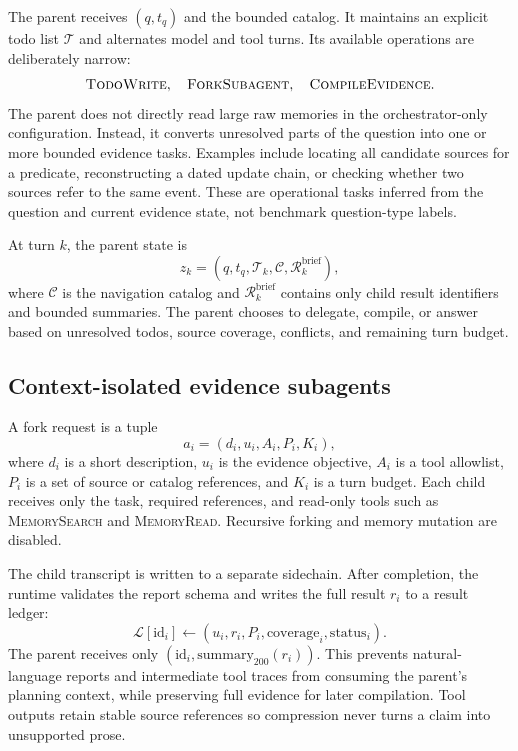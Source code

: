 \documentclass{article}
\begin{document}
The parent receives $(q,t_q)$ and the bounded catalog. It maintains an explicit
todo list $\mathcal{T}$ and alternates model and tool turns. Its available
operations are deliberately narrow:
\begin{equation}
\textsc{TodoWrite},\quad \textsc{ForkSubagent},\quad
\textsc{CompileEvidence}.
\end{equation}
The parent does not directly read large raw memories in the orchestrator-only
configuration. Instead, it converts unresolved parts of the question into one
or more bounded evidence tasks. Examples include locating all candidate sources
for a predicate, reconstructing a dated update chain, or checking whether two
sources refer to the same event. These are operational tasks inferred from the
question and current evidence state, not benchmark question-type labels.

At turn $k$, the parent state is
\begin{equation}
    z_k = (q,t_q,\mathcal{T}_k,\mathcal{C},\mathcal{R}^{\mathrm{brief}}_k),
\end{equation}
where $\mathcal{C}$ is the navigation catalog and
$\mathcal{R}^{\mathrm{brief}}_k$ contains only child result identifiers and
bounded summaries. The parent chooses to delegate, compile, or answer based on
unresolved todos, source coverage, conflicts, and remaining turn budget.

\subsection{Context-isolated evidence subagents}

A fork request is a tuple
\begin{equation}
    a_i=(d_i, u_i, A_i, P_i, K_i),
\end{equation}
where $d_i$ is a short description, $u_i$ is the evidence objective, $A_i$ is a
tool allowlist, $P_i$ is a set of source or catalog references, and $K_i$ is a
turn budget. Each child receives only the task, required references, and
read-only tools such as \textsc{MemorySearch} and \textsc{MemoryRead}. Recursive
forking and memory mutation are disabled.

The child transcript is written to a separate sidechain. After completion, the
runtime validates the report schema and writes the full result $r_i$ to a
result ledger:
\begin{equation}
    \mathcal{L}[\mathrm{id}_i] \leftarrow
    (u_i,r_i,P_i,\mathrm{coverage}_i,\mathrm{status}_i).
\end{equation}
The parent receives only $(\mathrm{id}_i,\mathrm{summary}_{200}(r_i))$. This
prevents natural-language reports and intermediate tool traces from consuming
the parent's planning context, while preserving full evidence for later
compilation. Tool outputs retain stable source references so compression never
turns a claim into unsupported prose.
\end{document}
